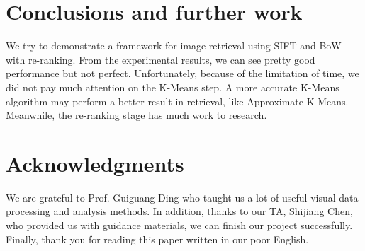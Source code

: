 \documentclass{acm_proc_article-sp}
\begin{document}
\section{Conclusions and further work}
We try to demonstrate a framework for image retrieval using SIFT and BoW with re-ranking. From the experimental results, we can see pretty good performance but not perfect. Unfortunately, because of the limitation of time, we did not pay much attention on the K-Means step. A more accurate K-Means algorithm may perform a better result in retrieval, like Approximate K-Means\cite{cPhilbin07:Object}. Meanwhile, the re-ranking stage has much work to research\cite{d658:Hough}.

\section{Acknowledgments}
We are grateful to Prof. Guiguang Ding who taught us a lot of useful visual data processing and analysis methods. In addition, thanks to our TA, Shijiang Chen, who provided us with guidance materials, we can finish our project successfully. Finally, thank you for reading this paper written in our poor English.


\end{document}
